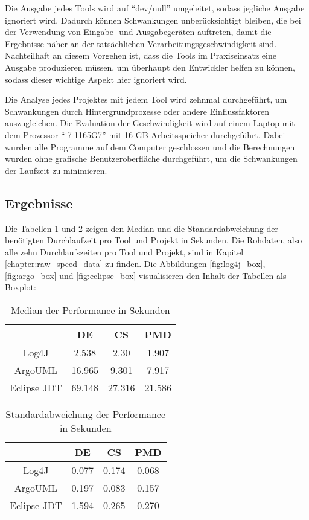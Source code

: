  Die Ausgabe jedes Tools wird auf \enquote{dev/null} umgeleitet, sodass jegliche Ausgabe ignoriert wird. Dadurch können Schwankungen unberücksichtigt bleiben, die bei der Verwendung von Eingabe- und Ausgabegeräten auftreten, damit die Ergebnisse näher an der tatsächlichen Verarbeitungsgeschwindigkeit sind.  Nachteilhaft an diesem Vorgehen ist, dass die Tools im Praxiseinsatz eine Ausgabe produzieren müssen, um überhaupt den Entwickler helfen zu können, sodass dieser wichtige Aspekt hier ignoriert wird. 
 
 Die Analyse jedes Projektes mit jedem Tool wird zehnmal durchgeführt, um Schwankungen durch Hintergrundprozesse oder andere Einflussfaktoren auszugleichen. Die Evaluation der Geschwindigkeit wird auf einem Laptop mit dem Prozessor \enquote{i7-1165G7} mit 16 GB Arbeitsspeicher durchgeführt. Dabei wurden alle Programme auf dem Computer geschlossen und die Berechnungen wurden ohne grafische Benutzeroberfläche durchgeführt, um die Schwankungen der Laufzeit zu minimieren.  
 \subsection{Ergebnisse}
 Die Tabellen \ref{tab:median_speed} und \ref{tab:std_speed} zeigen den Median und die Standardabweichung der benötigten Durchlaufzeit pro Tool und Projekt in Sekunden. Die Rohdaten, also alle zehn Durchlaufszeiten pro Tool und Projekt, sind in Kapitel \ref{chapter:raw_speed_data} zu finden. Die Abbildungen \ref{fig:log4j_box}, \ref{fig:argo_box} und \ref{fig:eclipse_box} visualisieren den Inhalt der Tabellen als Boxplot: 
 \begin{table}[]
     \centering
     \begin{tabular}{c|c|c|c}
        & DE & CS & PMD  \\\hline
        Log4J & 2.538 & 2.30 & 1.907\\\hline 
        ArgoUML & 16.965 & 9.301 & 7.917 \\\hline
        Eclipse JDT & 69.148 & 27.316 & 21.586
     \end{tabular}
     \caption{Median der Performance in Sekunden}
     \label{tab:median_speed}
 \end{table}
 
  \begin{table}[]
     \centering
     \begin{tabular}{c|c|c|c}
        & DE & CS & PMD  \\\hline
        Log4J & 0.077 &  0.174 &  0.068\\\hline 
        ArgoUML & 0.197 &  0.083 & 0.157 \\\hline
        Eclipse JDT & 1.594 & 0.265 & 0.270\\\hline
     \end{tabular}
     \caption{Standardabweichung der Performance in Sekunden}
     \label{tab:std_speed}
 \end{table}
 
